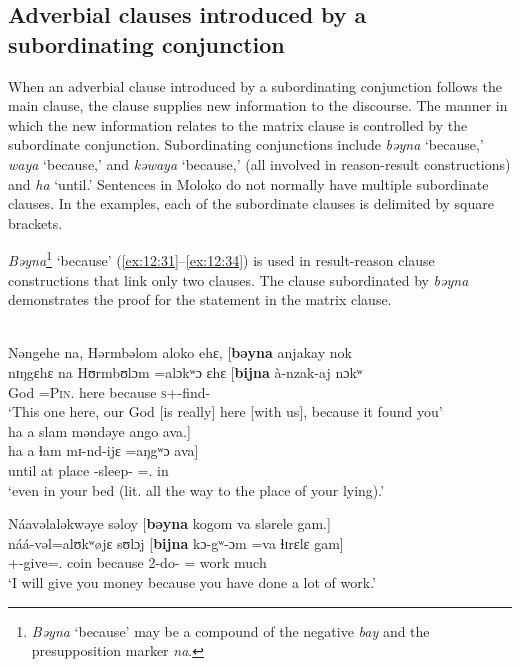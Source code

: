 \subsection{Adverbial clauses introduced by a subordinating conjunction}\label{sec:12.3.1}
\hypertarget{RefHeading1213441525720847}{}
When an adverbial clause introduced by a subordinating conjunction follows the main clause, the clause supplies new information to the discourse. The manner in which the new information relates to the matrix clause is controlled by the subordinate conjunction. Subordinating conjunctions include \textit{bəyna} ‘because,’ \textit{ waya} ‘because,’ and \textit{kəwaya} ‘because,’ (all involved in reason-result constructions) and \textit{ha} ‘until.’ Sentences in Moloko do not normally have multiple subordinate clauses. In the examples, each of the subordinate clauses is delimited by square brackets.  

\textit{Bəyna}\footnote{\textit{Bəyna} ‘because’ may be a compound of the negative \textit{bay} and the presupposition marker \textit{na}. }  ‘because’ (\ref{ex:12:31}--\ref{ex:12:34}) is used in result-reason clause constructions that link only two clauses. The clause subordinated by \textit{bəyna} demonstrates the proof for the statement in the matrix clause. 

\clearpage
\ea \label{ex:12:31}
\\
Nəngehe  na,   Hərmbəlom  aloko  ehɛ,  [\textbf{bəyna}  anjakay  nok\\ 
\gll  nɪŋgɛhɛ na   Hʊrmbʊlɔm    =alɔkʷɔ  ɛhɛ  [\textbf{bijna} à-nzak-aj  nɔkʷ \\ 
      {\DEM}     {\PSP}       God    =\textsc{Pin}.{\POSS}   here      because   \textsc{s}+{\PFV}-find{}-{\CL}  {\twoS} \\    
\glt ‘This one here, our God [is really] here [with us], because it found you’\\      
      
      \medskip
ha  a  slam  məndəye  ango  ava.]\\      
\gll ha a ɬam mɪ-nd-ijɛ =aŋgʷɔ ava]\\
     until  at    place  {\NOM}{}-sleep-{\CL}     ={\twoS}.{\POSS}  in\\
\glt  ‘even in your bed (lit. all the way to the place of your lying).’ 
\z 

\ea \label{ex:12:32}
Náavəlaləkwəye  səloy  [\textbf{bəyna}  kogom  va  slərele  gam.]\\
\gll  náá-vəl=alʊkʷøjɛ   sʊlɔj     [\textbf{bijna}  kɔ-gʷ{}-ɔm =va  ɬɪrɛlɛ  gam]\\
      {\oneS}+{\POT}-give={\twoP}.{\IO}  coin    because  2-do-{\twoP}  ={\PRF}  work  much\\
\glt  ‘I will give you money because you have done a lot of work.’
\z  

